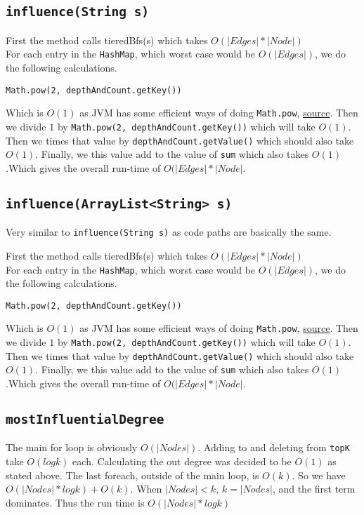 \documentclass[10pt,letterpaper]{article}
\begin{document}
\subsection{\texttt{influence(String s)}}
First the method calls tieredBfs(s) which takes $O(|Edges| * |Node|)$\\
For each entry in the \texttt{HashMap}, which worst case would be $O(|Edges|)$, we do the following calculations.

\begin{verbatim}
Math.pow(2, depthAndCount.getKey()) 
\end{verbatim}
Which is $O(1)$ as JVM has some efficient ways of doing \texttt{Math.pow}, \href{https://stackoverflow.com/a/32419139/749721}{source}.
Then we divide $1$ by \texttt{Math.pow(2, depthAndCount.getKey())} which will
take $O(1)$. Then we times that value by \texttt{depthAndCount.getValue()} which should also take $O(1)$. Finally, we this value add to the value of \texttt{sum} which also takes $O(1)$.Which gives the overall run-time of $O(|Edges| * |Node|$.
\subsection{\texttt{influence(ArrayList<String> s)}}
Very similar to \texttt{influence(String s)} as code paths are basically the same.

First the method calls tieredBfs(s) which takes $O(|Edges| * |Node|)$\\
For each entry in the \texttt{HashMap}, which worst case would be $O(|Edges|)$, we do the following calculations.

\begin{verbatim}
Math.pow(2, depthAndCount.getKey()) 
\end{verbatim}
Which is $O(1)$ as JVM has some efficient ways of doing \texttt{Math.pow}, \href{https://stackoverflow.com/a/32419139/749721}{source}.
Then we divide $1$ by \texttt{Math.pow(2, depthAndCount.getKey())} which will
take $O(1)$. Then we times that value by \texttt{depthAndCount.getValue()} which should also take $O(1)$. Finally, we this value add to the value of \texttt{sum} which also takes $O(1)$.Which gives the overall run-time of $O(|Edges| * |Node|$.
\subsection{\texttt{mostInfluentialDegree}}
The main for loop is obviously $O(|Nodes|)$. Adding to and deleting from \texttt{topK} take $O(log k)$ each. Calculating the out degree was decided to be $O(1)$ as stated above. The last foreach, outside of the main loop, is $O(k)$. So we have $O(|Nodes|*log k)+O(k)$. When $|Nodes|<k$, $k=|Nodes|$, and the first term dominates. Thus the run time is $O(|Nodes|*log k)$
\end{document}
